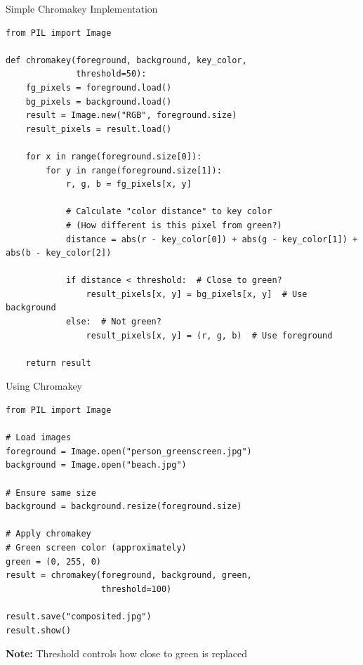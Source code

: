 \documentclass{csbeamer}
\begin{document}
\begin{frame}[fragile]{Simple Chromakey Implementation}
    \begin{lstlisting}
from PIL import Image

def chromakey(foreground, background, key_color,
              threshold=50):
    fg_pixels = foreground.load()
    bg_pixels = background.load()
    result = Image.new("RGB", foreground.size)
    result_pixels = result.load()

    for x in range(foreground.size[0]):
        for y in range(foreground.size[1]):
            r, g, b = fg_pixels[x, y]

            # Calculate "color distance" to key color
            # (How different is this pixel from green?)
            distance = abs(r - key_color[0]) + abs(g - key_color[1]) + abs(b - key_color[2])

            if distance < threshold:  # Close to green?
                result_pixels[x, y] = bg_pixels[x, y]  # Use background
            else:  # Not green?
                result_pixels[x, y] = (r, g, b)  # Use foreground

    return result
    \end{lstlisting}
\end{frame}

\begin{frame}[fragile]{Using Chromakey}
    \begin{lstlisting}
from PIL import Image

# Load images
foreground = Image.open("person_greenscreen.jpg")
background = Image.open("beach.jpg")

# Ensure same size
background = background.resize(foreground.size)

# Apply chromakey
# Green screen color (approximately)
green = (0, 255, 0)
result = chromakey(foreground, background, green,
                   threshold=100)

result.save("composited.jpg")
result.show()
    \end{lstlisting}

    \vspace{1em}

    \textbf{Note:} Threshold controls how close to green is replaced
\end{frame}
\end{document}
